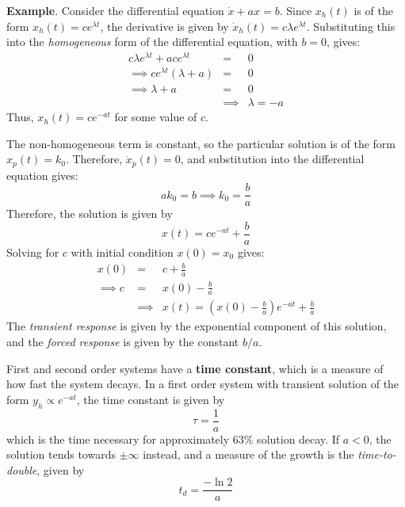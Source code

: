 \textbf{Example}. Consider the differential equation $\dot x +ax = b$. Since $x_h(t)$ is of the form $x_h(t) = ce^{\lambda t}$, the derivative is given by $\dot x_h(t) = c\lambda e^{\lambda t}$. Substituting this into the \textit{homogeneous} form of the differential equation, with $b=0$, gives: \begin{eqnarray*}
    c\lambda e^{\lambda t} + ace^{\lambda t} &=& 0\\
    \implies ce^{\lambda t} (\lambda + a) &=& 0\\
    \implies \lambda + a &=& 0\\
    &\implies& \boxed{\lambda = -a}
\end{eqnarray*} Thus, $x_h(t) = ce^{-at}$ for some value of $c$.

The non-homogeneous term is constant, so the particular solution is of the form $x_p(t)= k_0$. Therefore, $\dot x_p(t)=0$, and substitution into the differential equation gives: \[ak_0 = b \implies k_0 = \frac{b}{a}\] Therefore, the solution is given by \[x(t) = ce^{-at} + \frac{b}{a}\] Solving for $c$ with initial condition $x(0)=x_0$ gives: \begin{eqnarray*}
    x(0) &=& c + \frac{b}{a}\\
    \implies c &=& x(0)-\frac{b}{a}\\
    &\implies& \boxed{x(t) = \left(x(0) - \frac{b}{a}\right) e^{-at} + \frac{b}{a}}
\end{eqnarray*} The \textit{transient response} is given by the exponential component of this solution, and the \textit{forced response} is given by the constant $b/a$.

First and second order systems have a \textbf{time constant}, which is a measure of how fast the system decays. In a first order system with transient solution of the form $y_h\propto e^{-at}$, the time constant is given by \[\tau = \frac{1}{a}\] which is the time necessary for approximately $63\%$ solution decay. If $a<0$, the solution tends towards $\pm\infty$ instead, and a measure of the growth is the \textit{time-to-double}, given by \[t_d = \frac{-\ln 2}{a}\] 

